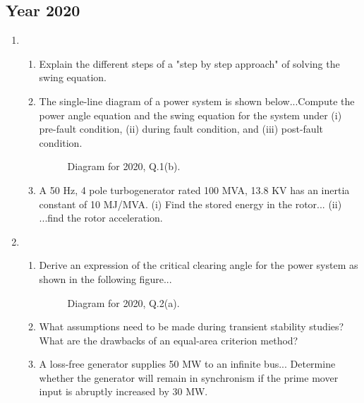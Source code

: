 \documentclass[12pt, a4paper]{article}
\begin{document}
	\subsection{Year 2020}
	\begin{enumerate}[label=\textbf{Q\arabic*.}, wide, labelindent=0pt]
		\item
		\begin{enumerate}[label=\textbf{(\alph*)}]
			\item Explain the different steps of a "step by step approach" of solving the swing equation.
			\item The single-line diagram of a power system is shown below...Compute the power angle equation and the swing equation for the system under (i) pre-fault condition, (ii) during fault condition, and (iii) post-fault condition.
			\begin{figure}[h!]
				\centering
				\caption{Diagram for 2020, Q.1(b).}
			\end{figure}
			\item A 50 Hz, 4 pole turbogenerator rated 100 MVA, 13.8 KV has an inertia constant of 10 MJ/MVA. (i) Find the stored energy in the rotor... (ii) ...find the rotor acceleration.
		\end{enumerate}
		\item
		\begin{enumerate}[label=\textbf{(\alph*)}]
			\item Derive an expression of the critical clearing angle for the power system as shown in the following figure...
			\begin{figure}[h!]
				\centering
				\caption{Diagram for 2020, Q.2(a).}
			\end{figure}
			\item What assumptions need to be made during transient stability studies? What are the drawbacks of an equal-area criterion method?
			\item A loss-free generator supplies 50 MW to an infinite bus... Determine whether the generator will remain in synchronism if the prime mover input is abruptly increased by 30 MW.
		\end{enumerate}
	\end{enumerate}
	
\end{document}
